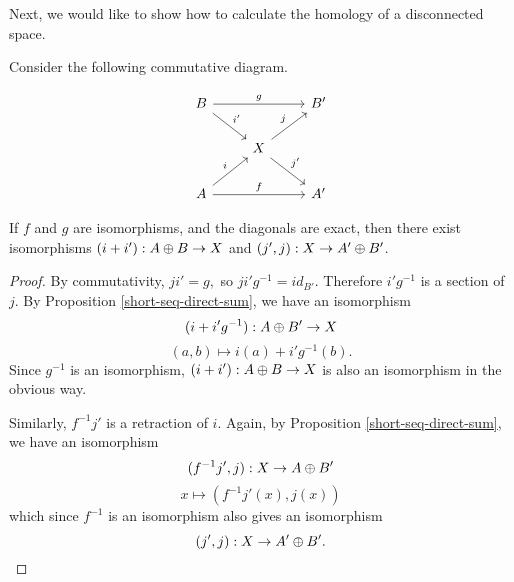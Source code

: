 Next, we would like to show how to calculate the homology of a disconnected space.

\begin{lemma}\label{dsum-lemma}
Consider the following commutative diagram.

\[\begin{tikzcd}
B \arrow[rr, "g"] \arrow[rd, "i'"] &                                    & B' \\
                                   & X \arrow[ru, "j"] \arrow[rd, "j'"] &    \\
A \arrow[ru, "i"] \arrow[rr, "f"]  &                                    & A'
\end{tikzcd}\]

If $f$ and $g$ are isomorphisms, and the diagonals are exact, then there exist isomorphisms $(i+i'):A\oplus B\rightarrow X$ and $(j',j):X\rightarrow A'\oplus B'$.
\end{lemma}
\begin{proof}
By commutativity, $ji'=g,$ so $ji'g^{-1}=id_{B'}$. Therefore $i'g^{-1}$ is a section of $j$. By Proposition \ref{short-seq-direct-sum}, we have an isomorphism $$(i+i'g^{-1}):A\oplus B'\rightarrow X$$
$$(a,b)\mapsto i(a)+i'g^{-1}(b).$$
Since $g^{-1}$ is an isomorphism, $(i+i'):A\oplus B\rightarrow X$ is also an isomorphism in the obvious way.

Similarly, $f^{-1}j'$ is a retraction of $i$. Again, by Proposition \ref{short-seq-direct-sum}, we have an isomorphism $$(f^{-1}j',j):X\rightarrow A\oplus B'$$
$$x\mapsto (f^{-1}j'(x),j(x))$$
which since $f^{-1}$ is an isomorphism also gives an isomorphism 
$$(j',j):X\rightarrow A'\oplus B'.$$
\end{proof}


